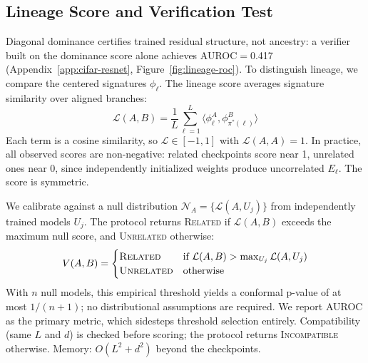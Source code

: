 \subsection{Lineage Score and Verification Test}\label{sec:lineage-score}

Diagonal dominance certifies trained residual structure, not ancestry: a verifier built on the dominance score alone achieves AUROC$=$0.417 (Appendix~\ref{app:cifar-resnet}, Figure~\ref{fig:lineage-roc}). To distinguish lineage, we compare the centered signatures $\phi_\ell$. The lineage score averages signature similarity over aligned branches:
\begin{equation}\label{eq:lineage-score}
\mathcal{L}(A, B) = \frac{1}{L} \sum_{\ell=1}^{L} \langle \phi^A_\ell, \phi^B_{\pi^*(\ell)} \rangle
\end{equation}
Each term is a cosine similarity, so $\mathcal{L} \in [-1,1]$ with $\mathcal{L}(A,A) = 1$. In practice, all observed scores are non-negative: related checkpoints score near 1, unrelated ones near 0, since independently initialized weights produce uncorrelated $E_\ell$. The score is symmetric.

We calibrate against a null distribution $\mathcal{N}_A = \{\mathcal{L}(A, U_j)\}$ from independently trained models $U_j$. The protocol returns \textsc{Related} if $\mathcal{L}(A,B)$ exceeds the maximum null score, and \textsc{Unrelated} otherwise:
\begin{equation}\label{eq:verdict}
V(A,B) = \begin{cases}
\textsc{Related} & \text{if } \mathcal{L}(A,B) > \max_{U_j} \mathcal{L}(A, U_j) \\
\textsc{Unrelated} & \text{otherwise}
\end{cases}
\end{equation}
With $n$ null models, this empirical threshold yields a conformal p-value of at most $1/(n+1)$; no distributional assumptions are required. We report AUROC as the primary metric, which sidesteps threshold selection entirely. Compatibility (same $L$ and $d$) is checked before scoring; the protocol returns \textsc{Incompatible} otherwise. Memory: $O(L^2 + d^2)$ beyond the checkpoints.
